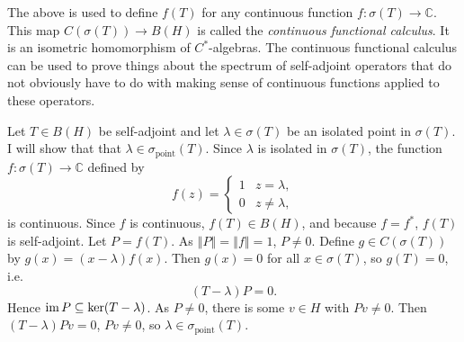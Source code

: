 \documentclass{article}
\newcommand{\im}{\textrm{im\,}}
\newcommand{\point}{\sigma_{\textrm{point}}}
\newcommand{\norm}[1]{\left\Vert #1 \right\Vert}
\begin{document}
The above is used to define $f(T)$ for any continuous function $f:\sigma(T) \to \mathbb{C}$. This map
$C(\sigma(T)) \to B(H)$
is called the {\em continuous functional calculus}. It is an isometric homomorphism of $C^*$-algebras.
The continuous functional calculus can be 
used to prove things about the spectrum of self-adjoint operators that do not obviously have
to do with making sense of continuous functions applied to these operators.

Let $T \in B(H)$ be
self-adjoint and let $\lambda \in \sigma(T)$ be an isolated point in $\sigma(T)$. I will show that that $\lambda 
\in \point(T)$. Since $\lambda$ is isolated in $\sigma(T)$, the function $f:\sigma(T) \to \mathbb{C}$
defined by 
\[
f(z)=\begin{cases}
1&z=\lambda,\\
0&z \neq \lambda,
\end{cases}
\]
is continuous. Since $f$ is continuous, $f(T) \in B(H)$, and because $f=f^*$, $f(T)$ is self-adjoint. Let $P=f(T)$. As $\norm{P}=\norm{f}=1$,
$P \neq 0$. Define $g \in C(\sigma(T))$ by $g(x)=(x-\lambda)f(x)$. Then $g(x)=0$ for all $x \in \sigma(T)$, so
$g(T)=0$, i.e.
\[
(T-\lambda)P=0.
\]
Hence $\im P \subseteq \ker(T-\lambda)$. As $P \neq 0$, there is some $v \in H$ with $Pv \neq 0$.
Then $(T-\lambda)Pv=0$, $Pv \neq 0$, so
$\lambda \in \point(T)$.
\end{document}
